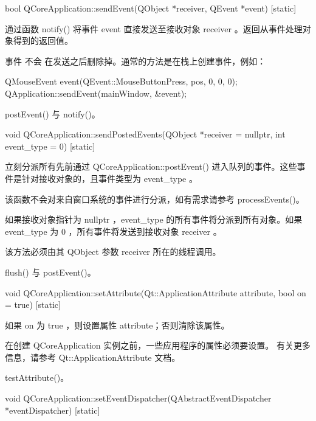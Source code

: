 bool QCoreApplication::sendEvent(QObject *receiver, QEvent *event) [static]

通过函数 notify() 将事件 event 直接发送至接收对象 receiver 。返回从事件处理对象得到的返回值。

事件 不会 在发送之后删除掉。通常的方法是在栈上创建事件，例如：

\begin{cppcode}
QMouseEvent event(QEvent::MouseButtonPress, pos, 0, 0, 0);
QApplication::sendEvent(mainWindow, &event);
\end{cppcode}



\begin{seeAlso}
postEvent() 与 notify()。
\end{seeAlso}

void QCoreApplication::sendPostedEvents(QObject *receiver = nullptr, int event\_type = 0) [static]

立刻分派所有先前通过 QCoreApplication::postEvent() 进入队列的事件。这些事件是针对接收对象的，且事件类型为 event\_type 。

该函数不会对来自窗口系统的事件进行分派，如有需求请参考 processEvents()。

如果接收对象指针为 nullptr ，event\_type 的所有事件将分派到所有对象。如果 event\_type 为 0 ，所有事件将发送到接收对象 receiver 。


\begin{notice}
该方法必须由其 QObject 参数 receiver 所在的线程调用。

\end{notice}


\begin{seeAlso}
flush() 与 postEvent()。
\end{seeAlso}

void QCoreApplication::setAttribute(Qt::ApplicationAttribute attribute, bool on = true) [static]

如果 on 为 true ，则设置属性 attribute；否则清除该属性。

\begin{notice}
在创建 QCoreApplication 实例之前，一些应用程序的属性必须要设置。 有关更多信息，请参考 Qt::ApplicationAttribute 文档。
\end{notice}

\begin{seeAlso}
testAttribute()。
\end{seeAlso}

void QCoreApplication::setEventDispatcher(QAbstractEventDispatcher *eventDispatcher) [static]

